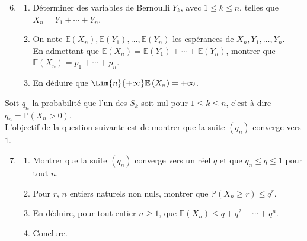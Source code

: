 \documentclass[landscape,twocolumn,leqno,a4paper,10pt]{report} %
\newcommand\n{\noindent}
\renewcommand{\geq}{\geqslant}
\renewcommand{\leq}{\leqslant}
\newcommand{\Prob}{\mathbb{P}}
\newcommand{\E}{\mathbb{E}}
\begin{document}
\begin{enumerate}\setcounter{enumi}{5}
	\item \begin{enumerate}
		\item Déterminer des variables de Bernoulli $Y_{k}$, avec $1 \leq k \leq n$, telles que $X_{n}=Y_{1}+\cdots+Y_{n}$.
		\item On note $\E\left(X_{n}\right), \E\left(Y_{1}\right), \ldots, \E\left(Y_{n}\right)$ les espérances de $X_{n}, Y_{1}, \ldots, Y_{n}$.\\
		En admettant que $\E\left(X_{n}\right)=\E\left(Y_{1}\right)+\cdots+\E\left(Y_{n}\right)$, montrer que $\E\left(X_{n}\right)=p_{1}+\cdots+p_{n}$.
		\item En déduire que $\Lim{n}{+\infty}\E\left(X_{n}\right)=+\infty$.
	\end{enumerate}
\end{enumerate}

\n Soit $q_{n}$ la probabilité que l'un des $S_{k}$ soit nul pour $1 \leq k \leq n$, c'est-à-dire $q_{n}=\Prob\left(X_{n}>0\right)$.\\
L'objectif de la question suivante est de montrer que la suite $\left(q_{n}\right)$ converge vers $1$.

\begin{enumerate}\setcounter{enumi}{6}
	\item \begin{enumerate}
		\item Montrer que la suite $\left(q_{n}\right)$ converge vers un réel $q$ et que $q_{n} \leq q \leq 1$ pour tout $n$.
		\item Pour $r$, $n$ entiers naturels non nuls, montrer que $\Prob\left(X_{n} \geq r\right) \leq q^{r}$.
		\item En déduire, pour tout entier $n \geq 1$, que $\E\left(X_{n}\right) \leq q+q^{2}+\cdots+q^{n}$.
		\item Conclure.
	\end{enumerate}
\end{enumerate}
\end{document}
